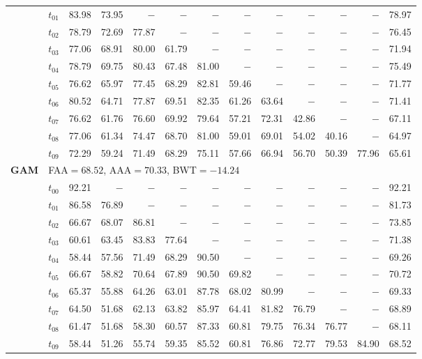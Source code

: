 \begin{table}[ht]
\begin{tabular}{@{}l l r r r r r r r r r r r@{}}
 & $t_{01}$ & 83.98 & 73.95 & $-$ & $-$ & $-$ & $-$ & $-$ & $-$ & $-$ & $-$ & 78.97 \\
 & $t_{02}$ & 78.79 & 72.69 & 77.87 & $-$ & $-$ & $-$ & $-$ & $-$ & $-$ & $-$ & 76.45 \\
 & $t_{03}$ & 77.06 & 68.91 & 80.00 & 61.79 & $-$ & $-$ & $-$ & $-$ & $-$ & $-$ & 71.94 \\
 & $t_{04}$ & 78.79 & 69.75 & 80.43 & 67.48 & 81.00 & $-$ & $-$ & $-$ & $-$ & $-$ & 75.49 \\
 & $t_{05}$ & 76.62 & 65.97 & 77.45 & 68.29 & 82.81 & 59.46 & $-$ & $-$ & $-$ & $-$ & 71.77 \\
 & $t_{06}$ & 80.52 & 64.71 & 77.87 & 69.51 & 82.35 & 61.26 & 63.64 & $-$ & $-$ & $-$ & 71.41 \\
 & $t_{07}$ & 76.62 & 61.76 & 76.60 & 69.92 & 79.64 & 57.21 & 72.31 & 42.86 & $-$ & $-$ & 67.11 \\
 & $t_{08}$ & 77.06 & 61.34 & 74.47 & 68.70 & 81.00 & 59.01 & 69.01 & 54.02 & 40.16 & $-$ & 64.97 \\
 & $t_{09}$ & 72.29 & 59.24 & 71.49 & 68.29 & 75.11 & 57.66 & 66.94 & 56.70 & 50.39 & 77.96 & 65.61 \\
\midrule
\multirow{11}{*}{\textbf{GAM}} & \multicolumn{12}{l}{\quad\small FAA$=68.52$,\; AAA$=70.33$,\; BWT$=-14.24$} \\
 & $t_{00}$ & 92.21 & $-$ & $-$ & $-$ & $-$ & $-$ & $-$ & $-$ & $-$ & $-$ & 92.21 \\
 & $t_{01}$ & 86.58 & 76.89 & $-$ & $-$ & $-$ & $-$ & $-$ & $-$ & $-$ & $-$ & 81.73 \\
 & $t_{02}$ & 66.67 & 68.07 & 86.81 & $-$ & $-$ & $-$ & $-$ & $-$ & $-$ & $-$ & 73.85 \\
 & $t_{03}$ & 60.61 & 63.45 & 83.83 & 77.64 & $-$ & $-$ & $-$ & $-$ & $-$ & $-$ & 71.38 \\
 & $t_{04}$ & 58.44 & 57.56 & 71.49 & 68.29 & 90.50 & $-$ & $-$ & $-$ & $-$ & $-$ & 69.26 \\
 & $t_{05}$ & 66.67 & 58.82 & 70.64 & 67.89 & 90.50 & 69.82 & $-$ & $-$ & $-$ & $-$ & 70.72 \\
 & $t_{06}$ & 65.37 & 55.88 & 64.26 & 63.01 & 87.78 & 68.02 & 80.99 & $-$ & $-$ & $-$ & 69.33 \\
 & $t_{07}$ & 64.50 & 51.68 & 62.13 & 63.82 & 85.97 & 64.41 & 81.82 & 76.79 & $-$ & $-$ & 68.89 \\
 & $t_{08}$ & 61.47 & 51.68 & 58.30 & 60.57 & 87.33 & 60.81 & 79.75 & 76.34 & 76.77 & $-$ & 68.11 \\
 & $t_{09}$ & 58.44 & 51.26 & 55.74 & 59.35 & 85.52 & 60.81 & 76.86 & 72.77 & 79.53 & 84.90 & 68.52 \\

\end{tabular}
\end{table}
